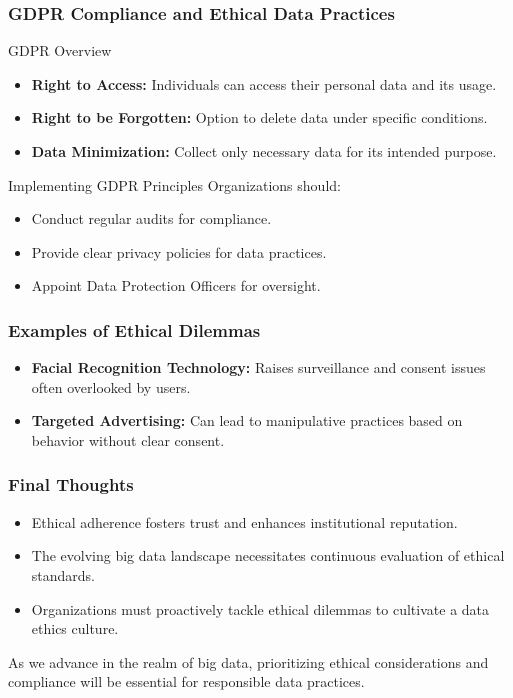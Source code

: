 \documentclass[aspectratio=169]{beamer}
\begin{document}
\begin{frame}[fragile]
    \frametitle{GDPR Compliance and Ethical Data Practices}
    \begin{block}{GDPR Overview}
        \begin{itemize}
            \item \textbf{Right to Access:} Individuals can access their personal data and its usage.
            \item \textbf{Right to be Forgotten:} Option to delete data under specific conditions.
            \item \textbf{Data Minimization:} Collect only necessary data for its intended purpose.
        \end{itemize}
    \end{block}

    \begin{block}{Implementing GDPR Principles}
        Organizations should:
        \begin{itemize}
            \item Conduct regular audits for compliance.
            \item Provide clear privacy policies for data practices.
            \item Appoint Data Protection Officers for oversight.
        \end{itemize}
    \end{block}
\end{frame}

\begin{frame}[fragile]
    \frametitle{Examples of Ethical Dilemmas}
    \begin{itemize}
        \item \textbf{Facial Recognition Technology:} Raises surveillance and consent issues often overlooked by users.
        \item \textbf{Targeted Advertising:} Can lead to manipulative practices based on behavior without clear consent.
    \end{itemize}
\end{frame}

\begin{frame}[fragile]
    \frametitle{Final Thoughts}
    \begin{itemize}
        \item Ethical adherence fosters trust and enhances institutional reputation.
        \item The evolving big data landscape necessitates continuous evaluation of ethical standards.
        \item Organizations must proactively tackle ethical dilemmas to cultivate a data ethics culture.
    \end{itemize}
    
    As we advance in the realm of big data, prioritizing ethical considerations and compliance will be essential for responsible data practices.
\end{frame}
\end{document}
